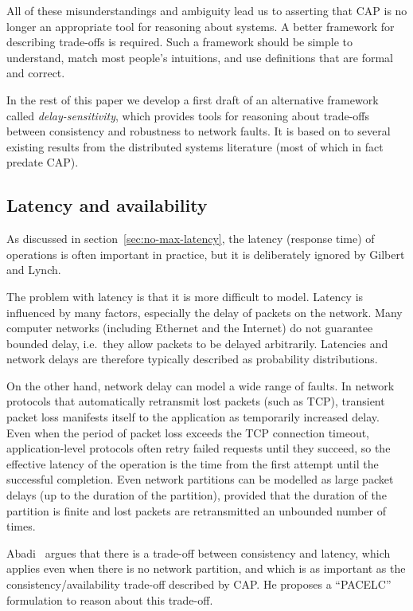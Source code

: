 \documentclass[a4paper,twocolumn,10pt]{article}
\begin{document}
All of these misunderstandings and ambiguity lead us to asserting that CAP is no longer an
appropriate tool for reasoning about systems. A better framework for describing trade-offs is
required. Such a framework should be simple to understand, match most people's intuitions, and use
definitions that are formal and correct.

In the rest of this paper we develop a first draft of an alternative framework called
\emph{delay-sensitivity}, which provides tools for reasoning about trade-offs between consistency
and robustness to network faults. It is based on to several existing results from the distributed
systems literature (most of which in fact predate CAP).

\subsection{Latency and availability}\label{sec:latency-availability}

As discussed in section~\ref{sec:no-max-latency}, the latency (response time) of operations is often
important in practice, but it is deliberately ignored by Gilbert and Lynch.

The problem with latency is that it is more difficult to model. Latency is influenced by many
factors, especially the delay of packets on the network. Many computer networks (including Ethernet
and the Internet) do not guarantee bounded delay, i.e.\ they allow packets to be delayed
arbitrarily. Latencies and network delays are therefore typically described as probability
distributions.

On the other hand, network delay can model a wide range of faults. In network protocols that
automatically retransmit lost packets (such as TCP), transient packet loss manifests itself to the
application as temporarily increased delay. Even when the period of packet loss exceeds the TCP
connection timeout, application-level protocols often retry failed requests until they succeed, so
the effective latency of the operation is the time from the first attempt until the successful
completion. Even network partitions can be modelled as large packet delays (up to the duration of
the partition), provided that the duration of the partition is finite and lost packets are
retransmitted an unbounded number of times.

Abadi~\cite{Abadi2012hb} argues that there is a trade-off between consistency and latency, which
applies even when there is no network partition, and which is as important as the
consistency/availability trade-off described by CAP. He proposes a ``PACELC'' formulation to reason
about this trade-off.
\end{document}
